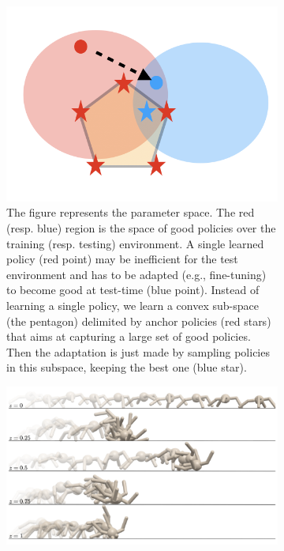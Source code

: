 \begin{figure}[t]
    \begin{subfigure}{.5\textwidth}
        \begin{center}
        \includegraphics[width=0.8\linewidth]{images/space2.png}
        \end{center}
        \vspace{-0.1cm}
        \caption{The figure represents the parameter space. The red  (resp. blue) region is the space of good policies over the training (resp. testing) environment. A single learned policy (red point) may be inefficient for the test environment and has to be adapted (e.g., fine-tuning) to become good at test-time (blue point). Instead of learning a single policy, we learn a convex sub-space (the pentagon) delimited by anchor policies (red stars) that aims at capturing a large set of good policies. Then the adaptation is just made by sampling policies in this subspace, keeping the best one (blue star).}
        \label{fig:3}
    \end{subfigure}
    \hspace{0.2cm}
        \begin{subfigure}{.5\textwidth}
        \includegraphics[width=1.0\textwidth]{images/k-shot_ant.png}

\end{subfigure}
\end{figure}
